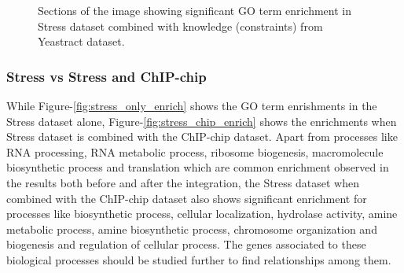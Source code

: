 \begin{figure}[p]
\centering
{}
\caption{Sections of the image showing significant GO term enrichment in Stress dataset combined with knowledge (constraints) from Yeastract dataset. }
\label{fig:stress_yt_enrich}
\end{figure}

\subsubsection{Stress vs Stress and ChIP-chip} 
While Figure-\ref{fig:stress_only_enrich} shows the GO term enrishments in the Stress dataset alone, Figure-\ref{fig:stress_chip_enrich} shows the enrichments when Stress dataset is
combined with the ChIP-chip dataset. Apart from processes like RNA processing, RNA metabolic process, ribosome biogenesis, macromolecule biosynthetic process and translation which 
are common enrichment observed in the results both before and after the integration, the Stress dataset when combined with the ChIP-chip dataset also shows significant enrichment 
for processes like biosynthetic process, cellular localization, hydrolase activity, amine metabolic process, amine biosynthetic process, chromosome organization 
and biogenesis and regulation of cellular process. The genes associated to these biological processes should be studied further to find relationships among them.

